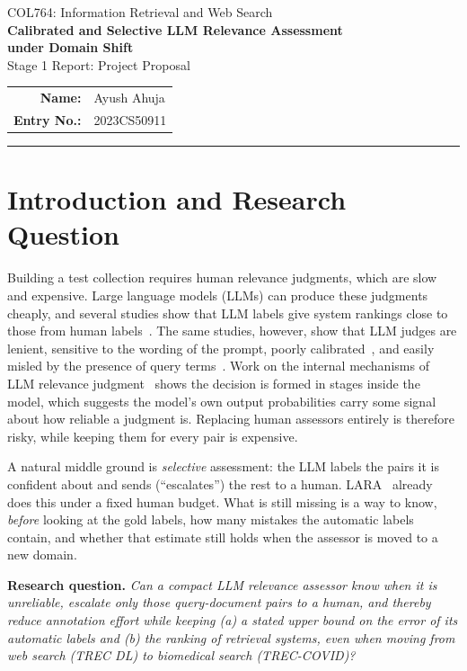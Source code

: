 \documentclass[11pt,a4paper]{article}
\begin{document}
\begin{center}
{\small COL764: Information Retrieval and Web Search}\\[4pt]
{\Large\bfseries Calibrated and Selective LLM Relevance Assessment\\[2pt] under Domain Shift}\\[6pt]
{\large Stage 1 Report: Project Proposal}\\[8pt]
\begin{tabular}{rl}
\textbf{Name:} & Ayush Ahuja \\
\textbf{Entry No.:} & 2023CS50911 \\
\end{tabular}
\end{center}
\vspace{-2pt}
\hrule
\vspace{6pt}

\section{Introduction and Research Question}
Building a test collection requires human relevance judgments, which are slow and expensive. Large language models (LLMs) can produce these judgments cheaply, and several studies show that LLM labels give system rankings close to those from human labels~\cite{faggioli2023,thomas2024,arabzadeh2025}. The same studies, however, show that LLM judges are lenient, sensitive to the wording of the prompt, poorly calibrated~\cite{tavakoli2025}, and easily misled by the presence of query terms~\cite{alaofi2026}. Work on the internal mechanisms of LLM relevance judgment~\cite{liu2025} shows the decision is formed in stages inside the model, which suggests the model's own output probabilities carry some signal about how reliable a judgment is. Replacing human assessors entirely is therefore risky, while keeping them for every pair is expensive.

A natural middle ground is \emph{selective} assessment: the LLM labels the pairs it is confident about and sends (``escalates'') the rest to a human. LARA~\cite{lara2025} already does this under a fixed human budget. What is still missing is a way to know, \emph{before} looking at the gold labels, how many mistakes the automatic labels contain, and whether that estimate still holds when the assessor is moved to a new domain.

\textbf{Research question.} \emph{Can a compact LLM relevance assessor know when it is unreliable, escalate only those query-document pairs to a human, and thereby reduce annotation effort while keeping (a) a stated upper bound on the error of its automatic labels and (b) the ranking of retrieval systems, even when moving from web search (TREC DL) to biomedical search (TREC-COVID)?}
\end{document}
